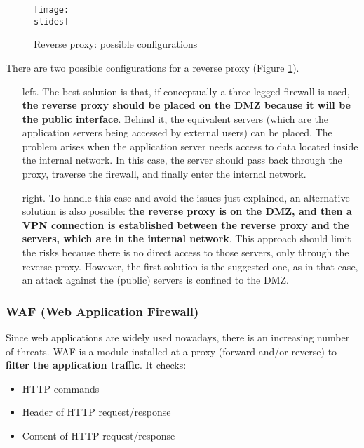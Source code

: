 \begin{figure}[h]
    \centering
    \texttt{[image: \\slides]}
    \caption{Reverse proxy: possible configurations}
    \label{fig:reverse-proxy}
\end{figure}


There are two possible configurations for a reverse proxy (Figure \ref{fig:reverse-proxy}). 
\begin{itemize}
    \item [left.] The best solution is that, if conceptually a three-legged firewall is used, \textbf{the reverse proxy should be placed on the DMZ because it will be the public interface}. Behind it, the equivalent servers (which are the application servers being accessed by external users) can be placed. The problem arises when the application server needs access to data located inside the internal network. In this case, the server should pass back through the proxy, traverse the firewall, and finally enter the internal network.
    \item [right.] To handle this case and avoid the issues just explained, an alternative solution is also possible: \textbf{the reverse proxy is on the DMZ, and then a VPN connection is established between the reverse proxy and the servers, which are in the internal network}. This approach should limit the risks because there is no direct access to those servers, only through the reverse proxy. However, the first solution is the suggested one, as in that case, an attack against the (public) servers is confined to the DMZ.
\end{itemize}


\subsubsection{WAF (Web Application Firewall)}

Since web applications are widely used nowadays, there is an increasing number of threats. WAF is a module installed at a proxy (forward and/or reverse) to \textbf{filter the application traffic}. It checks:

\begin{itemize}
    \item HTTP commands
    \item Header of HTTP request/response
    \item Content of HTTP request/response
\end{itemize}

